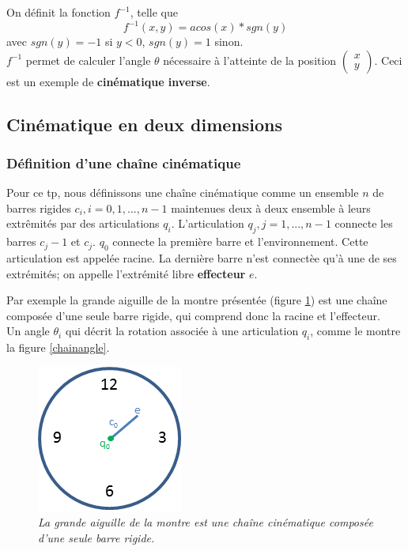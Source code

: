 \documentclass{article}
\begin{document}
On d\'efinit la fonction $f^{-1}$, telle que
 \begin{displaymath}  
f^{-1}(x, y) =  acos(x) * sgn(y)
 \end{displaymath}
avec $sgn(y) =  -1$ si $y < 0$, $sgn(y) =  1$ sinon. \\

$f^{-1}$ permet de calculer l'angle $\theta$ n\'ecessaire \`a l'atteinte de la position $\begin{pmatrix} x \\ y \end{pmatrix}$.
Ceci est un exemple de \textbf{cin\'ematique inverse}.

\subsection{Cin\'ematique en deux dimensions}
\subsubsection*{D\'efinition d'une cha\^ine cin\'ematique}
Pour ce tp, nous d\'efinissons une cha\^ine cin\'ematique comme un ensemble $n$ de barres rigides $c_i, i = 0,1, ... , n-1$ 
maintenues deux \`a deux ensemble \`a leurs extr\^emit\'es par des articulations $q_i$.
L'articulation $q_j, j = 1, ... , n-1$ connecte les barres $c_j-1$ et $c_j$. $q_0$
connecte la premi\`ere barre et l'environnement. Cette articulation est appel\'ee racine.
La derni\`ere barre n'est connect\`ee qu'\`a une de ses extr\'emit\'es; on appelle l'extr\'emit\'e libre \textbf{effecteur} $e$.

Par exemple la grande aiguille de la montre pr\'esent\'ee (figure 
\ref{watchcine}) est une cha\^ine compos\'ee d'une seule barre rigide, qui comprend donc la racine
et l'effecteur. \\

Un angle $\theta_i$ qui d\'ecrit la rotation associ\'ee \`a une articulation $q_i$, comme le montre 
la figure \ref{chainangle}.


\begin{figure}[htb]
  \centering
    \includegraphics[]{watchcine}
  \caption{
          \textit{La grande aiguille de la montre est une cha\^ine cin\'ematique compos\'ee d'une seule barre rigide.}}
		   \label{watchcine}
\end{figure}
\end{document}

